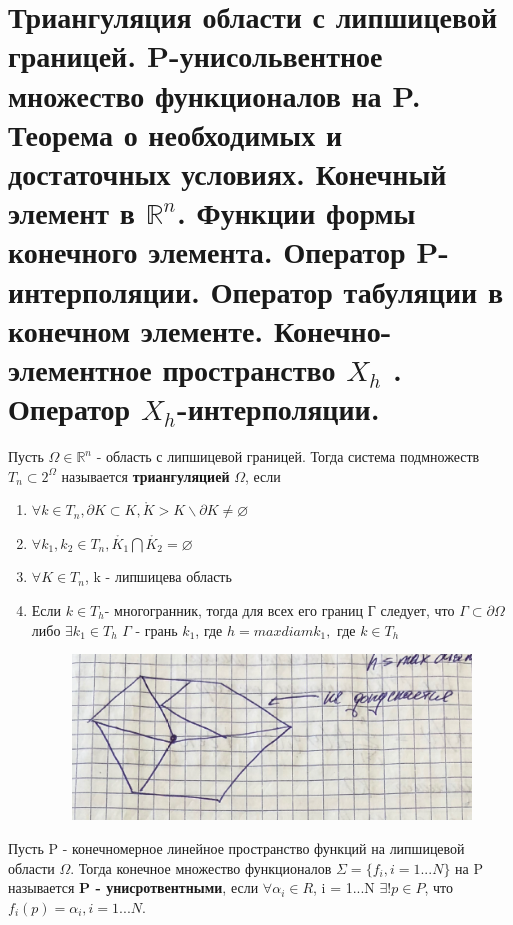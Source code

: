 \documentclass[__main__.tex]{subfiles}
\begin{document}
\section{Триангуляция области с липшицевой границей. P-унисольвентное множество функционалов на P. Теорема о необходимых и достаточных условиях. Конечный элемент в $\mathbb{R}^n$. Функции формы конечного элемента. Оператор P-интерполяции. Оператор табуляции в конечном элементе. Конечно-элементное пространство $X_h$ . Оператор $X_h$-интерполяции.}

\begin{definition}
Пусть $\Omega \in \mathbb{R}^n$ - область с липшицевой границей. Тогда система подмножеств $T_n \subset 2^{\Omega}$ называется \textbf{триангуляцией} $\Omega$, если 

\begin{enumerate}
	\item $\forall k \in T_n, \partial K \subset K, \mathring{K} > K\backslash\partial K \neq \varnothing$
	
	\item $\forall k_1, k_2 \in T_n, \mathring{K_1} \bigcap \mathring{K_2} = \varnothing$
	
	\item $\forall K \in T_n$, k - липшицева область
	
	\item Если $k \in T_h$- многогранник, тогда для всех его границ Г следует, что $\Gamma \subset\partial \Omega$ либо $\exists k_1 \in T_h$ $\Gamma$ - грань $k_1$, где $h = max diam k_1,$ где $k \in T_h$
	
	\begin{figure}[h!]
		\centering
		\includegraphics[width=0.7\linewidth]{screenshot002}
		\caption{}
		\label{fig:screenshot002}
	\end{figure}
\end{enumerate}
\end{definition}

\begin{definition}
Пусть P - конечномерное линейное пространство функций на липшицевой области $\Omega$. Тогда конечное множество функционалов $\Sigma = \{f_i, i = 1 ... N\}$ на P называется \textbf{P - унисротвентными}, если $\forall \alpha_i \in R$, i = 1...N $\exists! p\in P$, что $f_i\left(p\right) = \alpha_i, i = 1...N$.
\end{definition}
\end{document}

